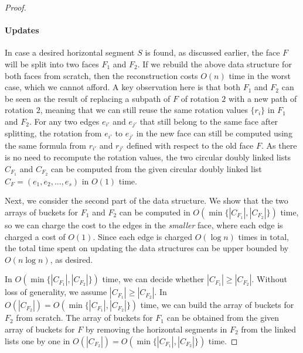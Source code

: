 \documentclass{theoretics}
\begin{document}
\begin{proof}
 \paragraph{Updates}
 In case a desired horizontal segment $S$ is found, as discussed earlier, the face $F$ will be split into two faces $F_1$ and $F_2$. If we rebuild the above data structure for both faces from scratch, then the reconstruction costs $O(n)$ time in the worst case, which we cannot afford. A key observation here is that both $F_1$ and $F_2$ can be seen as the result of replacing a subpath of $F$ of rotation $2$ with a new path of rotation $2$, meaning that we can still reuse the same rotation values $\{r_i\}$ in $F_1$ and $F_2$. For any two edges $e_{i'}$ and $e_{j'}$ that still belong to the same face after splitting, the rotation from $e_{i'}$ to $e_{j'}$ in the new face can still be computed using the same formula from $r_{i'}$ and $r_{j'}$ defined with respect to the old face $F$. As there is no need to recompute the rotation values, the two circular doubly linked lists $C_{F_1}$ and $C_{F_2}$ can be computed from the given circular doubly linked list $C_F=(e_1, e_2, \ldots, e_s)$ in $O(1)$ time.

Next, we consider the second part of the data structure. We show that the two arrays of buckets for $F_1$ and $F_2$ can be computed in $O(\min\{|C_{F_1}|, |C_{F_2}|\})$ time, so we can charge the cost to the edges in the \emph{smaller} face, where each edge is charged a cost of $O(1)$. Since each edge is charged $O(\log n)$ times in total, the total time spent on updating the data structures can be upper bounded by $O(n \log n)$, as desired.


In $O(\min\{|C_{F_1}|, |C_{F_2}|\})$ time, we can decide whether $|C_{F_1}| \geq |C_{F_2}|$. Without loss of generality, we assume $|C_{F_1}| \geq |C_{F_2}|$. In $O(|C_{F_2}|) = O(\min\{|C_{F_1}|, |C_{F_2}|\})$ time, we can build the array of buckets for $F_2$ from scratch. The array of buckets for $F_1$ can be obtained from the given array of buckets for $F$ by removing the horizontal segments in $F_2$ from the linked lists one by one in $O(|C_{F_2}|) = O(\min\{|C_{F_1}|, |C_{F_2}|\})$ time.
 
 

\end{proof}
\end{document}
